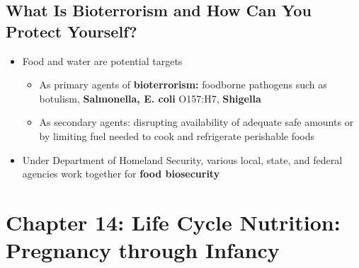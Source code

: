 \documentclass[12pt]{article}
\begin{document}
        \subsection{What Is Bioterrorism and How Can You Protect Yourself?}
            \begin{itemize}
                \item Food and water are potential targets
                    \begin{itemize}
                        \item As primary agents of \textbf{bioterrorism:} foodborne pathogens such as botulism, \textbf{Salmonella, E. coli} O157:H7, \textbf{Shigella}
                        \item As secondary agents: disrupting availability of adequate safe amounts or by limiting fuel needed to cook and refrigerate perishable foods
                    \end{itemize}
                \item Under Department of Homeland Security, various local, state, and federal agencies work together for \textbf{food biosecurity}
            \end{itemize}

    \section{Chapter 14: Life Cycle Nutrition: Pregnancy through Infancy}
        
\end{document}

